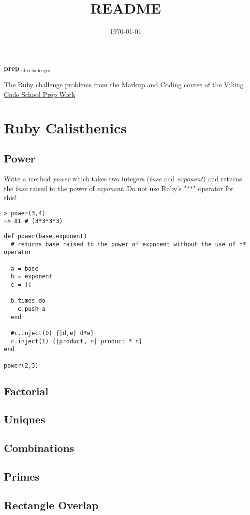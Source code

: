 \documentclass[11pt]{article}
\date{\today}
\title{README}
\begin{document}
\maketitle
\textbf{prep$_{\text{ruby}}$$_{\text{challenges}}$}

\href{http://www.vikingcodeschool.com/web-markup-and-coding/level-up-your-ruby-judo}{The Ruby challenge problems from the Markup and Coding course of the Viking Code School Prep Work}

\section{Ruby Calisthenics}
\label{sec-1}

\subsection{Power}
\label{sec-1-1}

Write a method \emph{power} which takes two integers (\emph{base} and \emph{exponent}) and 
returns the \emph{base} raised to the power of \emph{exponent}. Do not use Ruby's "**"
operator for this!

\begin{verbatim}
> power(3,4)
=> 81 # (3*3*3*3)
\end{verbatim}

\begin{verbatim}
def power(base,exponent)
  # returns base raised to the power of exponent without the use of ** operator

  a = base
  b = exponent
  c = []

  b.times do
    c.push a
  end

  #c.inject(0) {|d,e| d*e}
  c.inject(1) {|product, n| product * n}
end

power(2,3)
\end{verbatim}

\subsection{Factorial}
\label{sec-1-2}
\subsection{Uniques}
\label{sec-1-3}
\subsection{Combinations}
\label{sec-1-4}
\subsection{Primes}
\label{sec-1-5}
\subsection{Rectangle Overlap}
\label{sec-1-6}
\end{document}
